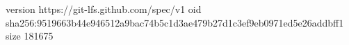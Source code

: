 version https://git-lfs.github.com/spec/v1
oid sha256:9519663b44e946512a9bac74b5c1d3ae479b27d1c3ef9eb0971ed5e26addbff1
size 181675
